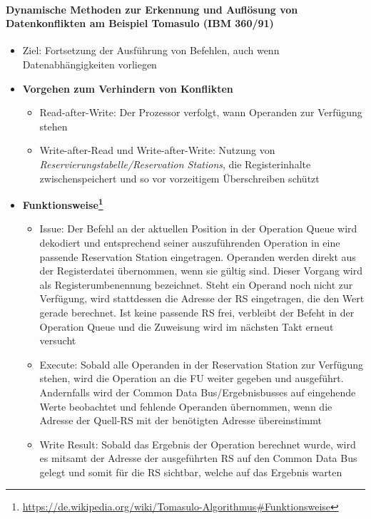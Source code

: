 		\paragraph{Dynamische Methoden zur Erkennung und Auflösung von Datenkonflikten am Beispiel Tomasulo (IBM 360/91)}
			\begin{itemize}
				\item Ziel: Fortsetzung der Ausführung von Befehlen, auch wenn Datenabhängigkeiten vorliegen
				\item \textbf{Vorgehen zum Verhindern von Konflikten}
				\begin{itemize}
					\item Read-after-Write: Der Prozessor verfolgt, wann Operanden zur Verfügung stehen
					\item Write-after-Read und Write-after-Write: Nutzung von \textit{Reservierungstabelle/Reservation Stations}, die Registerinhalte zwischenspeichert und so vor vorzeitigem Überschreiben schützt
				\end{itemize}
				\item \textbf{Funktionsweise\footnote{\url{https://de.wikipedia.org/wiki/Tomasulo-Algorithmus\#Funktionsweise}}}
				\begin{itemize}
					\item Issue: Der Befehl an der aktuellen Position in der Operation Queue wird dekodiert und entsprechend seiner auszuführenden Operation in eine passende Reservation Station eingetragen. Operanden werden direkt aus der Registerdatei übernommen, wenn sie gültig sind. Dieser Vorgang wird als Registerumbenennung bezeichnet. Steht ein Operand noch nicht zur Verfügung, wird stattdessen die Adresse der RS eingetragen, die den Wert gerade berechnet. Ist keine passende RS frei, verbleibt der Befeht in der Operation Queue und die Zuweisung wird im nächsten Takt erneut versucht
					\item Execute: Sobald alle Operanden in der Reservation Station zur Verfügung stehen, wird die Operation an die FU weiter gegeben und ausgeführt. Andernfalls wird der Common Data Bus/Ergebnisbusses auf eingehende Werte beobachtet und fehlende Operanden übernommen, wenn die Adresse der Quell-RS mit der benötigten Adresse übereinstimmt
					\item Write Result: Sobald das Ergebnis der Operation berechnet wurde, wird es mitsamt der Adresse der ausgeführten RS auf den Common Data Bus gelegt und somit für die RS sichtbar, welche auf das Ergebnis warten
				\end{itemize}
			\end{itemize}

